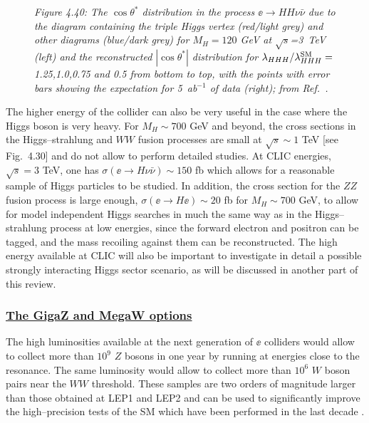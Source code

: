 \begin{figure}[!h]
\begin{center}
\end{center}
\vspace*{-0.8cm}
{\sl Figure 4.40: The $\cos \theta^*$ distribution in the process $\ee 
\to  HH\nu\bar{\nu}$ due to the diagram containing the triple Higgs vertex 
(red/light grey) and other diagrams (blue/dark grey) for $M_H=120$
GeV at $\sqrt{s}$=3~TeV (left) and the reconstructed $|\cos \theta^*|$ 
distribution for $\lambda_{HHH}/\lambda_{HHH}^{\rm SM}=$1.25,1.0,0.75 and 0.5 
from bottom to top, with the points with error bars showing the expectation 
for 5~ab$^{-1}$ of data (right); from Ref.~\cite{ee-H3-Battaglia}.} 
\vspace*{-0.3cm}
\end{figure}


The higher energy of the collider can also be very useful in the case where
the Higgs boson is very heavy. For $M_H \sim 700$ GeV and beyond, the cross
sections in the Higgs--strahlung and $WW$ fusion processes are small at
$\sqrt{s} \sim 1$ TeV [see Fig.~4.30] and do not allow to perform detailed
studies. At CLIC energies, $\sqrt{s}=3$ TeV, one has $\sigma (\ee \to H\nu \bar
\nu) \sim 150$ fb which allows for a reasonable sample of Higgs particles to
be studied. In addition, the cross section for the $ZZ$ fusion process is large
enough, $\sigma (\ee \to H\ee) \sim 20$ fb for $M_H \sim 700$ GeV, to allow for
model independent Higgs searches in much the same way as in the
Higgs--strahlung process at low energies, since the forward electron and
positron can be tagged, and the mass recoiling against them can be
reconstructed. The high energy available at CLIC will also be important to
investigate in detail a possible strongly interacting Higgs sector scenario, as
will be discussed in another part of this review.  

\subsubsection*{\underline{The GigaZ and MegaW options}}

The high luminosities available at the next generation of $\ee$ colliders
would allow to collect more than $10^{9}$ $Z$ bosons in one year by running 
at energies close to the resonance. The same luminosity would allow to collect
more than $10^6$ $W$ boson pairs near the $WW$ threshold. These samples are
two orders of magnitude larger than those obtained at LEP1 and LEP2 and can 
be used to significantly improve the high--precision tests of the SM which
have been performed in the last decade \cite{LC-GigaZ}. \s

